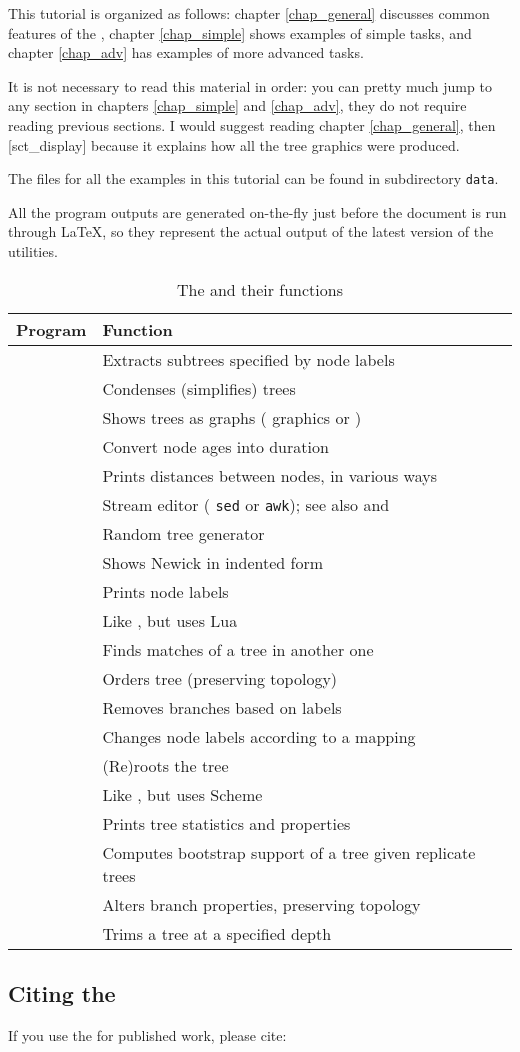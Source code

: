 This tutorial is organized as follows: chapter \ref{chap_general} discusses
common features of the \nutils, chapter \ref{chap_simple} shows examples of
simple tasks, and chapter \ref{chap_adv} has examples of more advanced tasks. 

It is not necessary to read this material in order: you can pretty much jump to
any section in chapters \ref{chap_simple} and \ref{chap_adv}, they do not
require reading previous sections. I would suggest reading chapter
\ref{chap_general}, then [sct_display] because it explains how all
the tree graphics were produced.

The files for all the examples in this tutorial can be found in
subdirectory \texttt{data}.

All the program outputs are generated on-the-fly just before the document is run
through \LaTeX{}, so they represent the actual output of the latest version of
the utilities.

\begin{table}[t]
\begin{tabular}{ll}
{\bf Program} & {\bf Function } \\
\hline
\clade		&	Extracts subtrees specified by node labels\\
\condense	&	Condenses (simplifies) trees \\
\display	&	Shows trees as graphs (\ascii{} graphics or \svg) \\
\duration	&	Convert node ages into duration \\
\distance	&	Prints distances between nodes, in various ways \\
\ed				&	Stream editor (\foreign{\`{a} la} \texttt{sed} or \texttt{awk}); see also \luaed{} and \sched \\
\gen			&	Random tree generator \\
\nwindent	&	Shows Newick in indented form \\ 
		&	Prints node labels \\
\luaed				&	Like \ed, but uses Lua\\
\match		&	Finds matches of a tree in another one \\
\order		&	Orders tree (preserving topology) \\
\prune		&	Removes branches based on labels \\ 
\rename		&	Changes node labels according to a mapping \\
\reroot		&	(Re)roots the tree \\
\sched				&	Like \luaed, but uses Scheme\\
\stats		&	Prints tree statistics and properties \\
\support	&	Computes bootstrap support of a tree given replicate trees \\
\topology	&	Alters branch properties, preserving topology \\
\trim		&	Trims a tree at a specified depth
\end{tabular}	
\caption{The \nutils{} and their functions}
\label{tbl_prog_list}
\end{table}

\subsection*{Citing the \nutils}

If you use the \nutils{} for published work, please cite:


